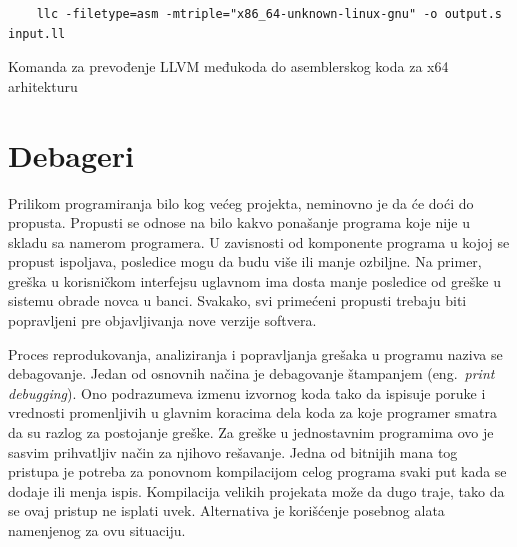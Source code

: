 \documentclass[12pt,oneside]{memoir}
\begin{document}
\begin{listing}[!ht]
  \begin{verbatim}
    llc -filetype=asm -mtriple="x86_64-unknown-linux-gnu" -o output.s input.ll
  \end{verbatim}
  \caption{Komanda za prevođenje LLVM međukoda do asemblerskog koda za x64 arhitekturu}
  \label{lst:llc_command}
\end{listing}


\chapter{Debageri}
\label{sec:debuggers}


Prilikom programiranja bilo kog većeg projekta, neminovno je da će doći do propusta.
Propusti se odnose na bilo kakvo ponašanje programa koje nije u skladu sa namerom programera.
U zavisnosti od komponente programa u kojoj se propust ispoljava, posledice mogu da budu više ili manje ozbiljne.
Na primer, greška u korisničkom interfejsu uglavnom ima dosta manje posledice od greške u sistemu obrade novca u banci.
Svakako, svi primećeni propusti trebaju biti popravljeni pre objavljivanja nove verzije softvera.

Proces reprodukovanja, analiziranja i popravljanja grešaka u programu naziva se debagovanje.
Jedan od osnovnih načina je debagovanje štampanjem (eng.~{\em print debugging}).
Ono podrazumeva izmenu izvornog koda tako da ispisuje poruke i vrednosti promenljivih u glavnim koracima dela koda za koje programer smatra da su razlog za postojanje greške.
Za greške u jednostavnim programima ovo je sasvim prihvatljiv način za njihovo rešavanje.
Jedna od bitnijih mana tog pristupa je potreba za ponovnom kompilacijom celog programa svaki put kada se dodaje ili menja ispis.
Kompilacija velikih projekata može da dugo traje, tako da se ovaj pristup ne isplati uvek.
Alternativa je korišćenje posebnog alata namenjenog za ovu situaciju.
\end{document}
